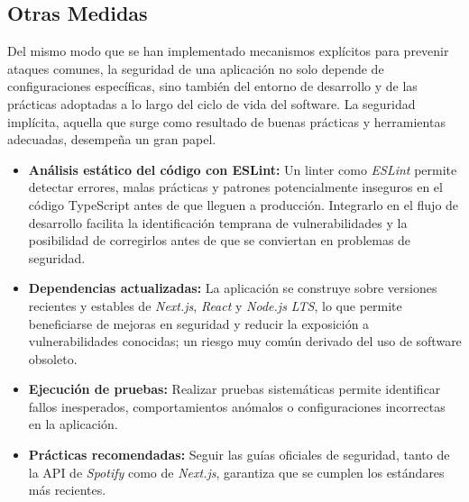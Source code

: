 \subsection{Otras Medidas}

Del mismo modo que se han implementado mecanismos explícitos para prevenir ataques comunes, la seguridad de una aplicación no solo depende de configuraciones específicas, sino también del entorno de desarrollo y de las prácticas adoptadas a lo largo del ciclo de vida del software. La seguridad implícita, aquella que surge como resultado de buenas prácticas y herramientas adecuadas, desempeña un gran papel.

\begin{itemize}
    \item \textbf{Análisis estático del código con ESLint:} Un linter como \textit{ESLint} permite detectar errores, malas prácticas y patrones potencialmente inseguros en el código TypeScript antes de que lleguen a producción. Integrarlo en el flujo de desarrollo facilita la identificación temprana de vulnerabilidades y la posibilidad de corregirlos antes de que se conviertan en problemas de seguridad.

    \item \textbf{Dependencias actualizadas:} La aplicación se construye sobre versiones recientes y estables de \textit{Next.js}, \textit{React} y \textit{Node.js LTS}, lo que permite beneficiarse de mejoras en seguridad y reducir la exposición a vulnerabilidades conocidas; un riesgo muy común derivado del uso de software obsoleto.

    \item \textbf{Ejecución de pruebas:} Realizar pruebas sistemáticas permite identificar fallos inesperados, comportamientos anómalos o configuraciones incorrectas en la aplicación.

    \item \textbf{Prácticas recomendadas:} Seguir las guías oficiales de seguridad, tanto de la API de \textit{Spotify} como de \textit{Next.js}, garantiza que se cumplen los estándares más recientes.
\end{itemize}
